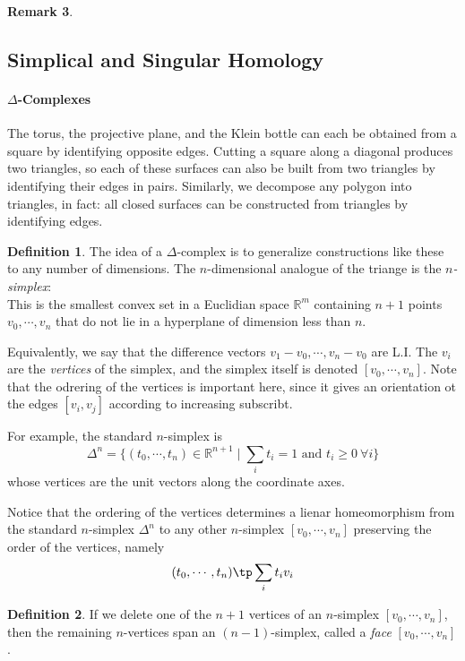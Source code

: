 \documentclass[11pt,a4paper]{article}
\theoremstyle{definition}
\newtheorem{definition}{Definition}[section]
\newtheorem{remark}[definition]{Remark}
\theoremstyle{plain}
\theoremstyle{remark}
\begin{document}
\begin{remark}
\subsection{Simplical and Singular Homology} 

\paragraph{$\Delta$-Complexes} The torus, the projective plane, and the Klein bottle 
can each be obtained from a square by identifying opposite edges. 
Cutting a square along a diagonal produces two triangles, so each of these surfaces can also be built from two 
triangles by identifying their edges in pairs. Similarly, we decompose any polygon into triangles, 
in fact: all closed surfaces can be constructed from triangles by identifying edges. 

\begin{definition}
  The idea of a $\Delta$-complex is to generalize constructions like these to any number of dimensions. The $n$-dimensional 
  analogue of the triange is the \emph{$n$-simplex}: \\
  This is the smallest convex set in a Euclidian space $\mathbb{R}^m$ containing $n+1$ points $v_0, \cdots, v_n$ 
  that do not lie in a hyperplane of dimension less than $n$.

  Equivalently, we say that the difference vectors $v_1 - v_0, \cdots, v_n - v_0$ are L.I.
  The $v_i$ are the \emph{vertices} of the simplex, and the simplex itself is denoted $[v_0, \cdots, v_n]$. 
  Note that the odrering of the vertices is important here, since it gives an orientation ot the edges $[v_i, v_j]$ according 
  to increasing subscribt. 
\end{definition}

For example, the standard $n$-simplex is 
$$ \Delta^n = \{(t_0, \cdots, t_n) \in \mathbb{R}^{n+1} \mid \sum_i t_i = 1 \text{ and } t_i \geq 0 \ \forall i\}$$
whose vertices are the unit vectors along the coordinate axes. 

Notice that the ordering of the vertices determines a lienar homeomorphism from the standard $n$-simplex 
$\Delta^n$ to any other $n$-simplex $[v_0, \cdots, v_n]$ preserving the order of the vertices, namely 
$$(t_0, \cdots, t_n) \tp \sum_i t_i v_i$$

\begin{definition}
  If we delete one of the $n+1$ vertices of an $n$-simplex $[v_0, \cdots, v_n]$, then the remaining 
  $n$-vertices span an $(n-1)$-simplex, called a \emph{face} $[v_0, \cdots, v_n]$. 
\end{definition}


\end{remark}
\end{document}
